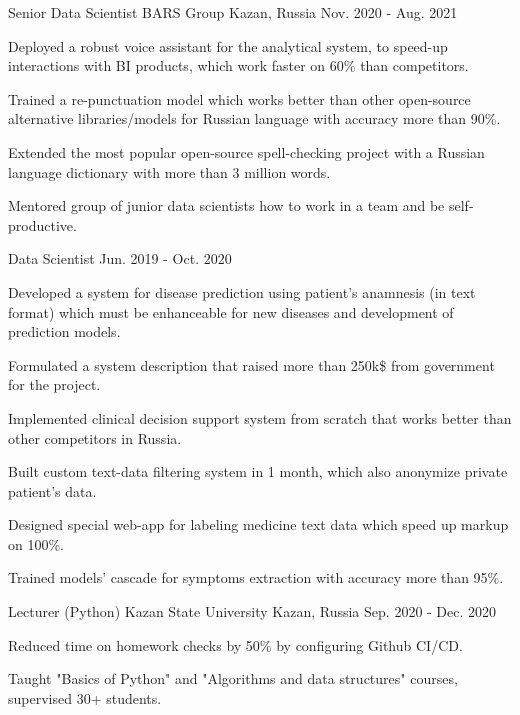 \begin{cventries}
  \cventry
    {Senior Data Scientist} %
    {BARS Group} %
    {Kazan, Russia} %
    {Nov. 2020 - Aug. 2021} %
    {
      \begin{cvitems} %
        \item {Deployed a robust voice assistant for the analytical system, to speed-up interactions with BI products, which work faster on 60\% than competitors.}
        \item {Trained a re-punctuation model which works better than other open-source alternative libraries/models for Russian language with accuracy more than 90\%.}
        \item {Extended the most popular open-source spell-checking project with a Russian language dictionary with more than 3 million words.}
        \item {Mentored group of junior data scientists how to work in a team and be self-productive.}
      \end{cvitems}
    }

  \cventry
    {Data Scientist} %
    {} %
    {} %
    {Jun. 2019 - Oct. 2020} %
    {
      \begin{cvitems} %
        \item {Developed a system for disease prediction using patient's anamnesis (in text format) which must be enhanceable for new diseases and development of prediction models.}
        \item {Formulated a system description that raised more than 250k\$ from government for the project.}
        \item {Implemented clinical decision support system from scratch that works better than other competitors in Russia.}
        \item {Built custom text-data filtering system in 1 month, which also anonymize private patient's data.}
        \item {Designed special web-app for labeling medicine text data which speed up markup on 100\%.}
        \item {Trained models' cascade for symptoms extraction with accuracy more than 95\%.}
      \end{cvitems}
    }

  \cventry
    {Lecturer (Python)} %
    {Kazan State University} %
    {Kazan, Russia} %
    {Sep. 2020 - Dec. 2020} %
    {
      \begin{cvitems} %
        \item {Reduced time on homework checks by 50\% by configuring Github CI/CD.}
        \item {Taught "Basics of Python" and "Algorithms and data structures" courses, supervised 30+ students.}
      \end{cvitems}
    }

\end{cventries}
